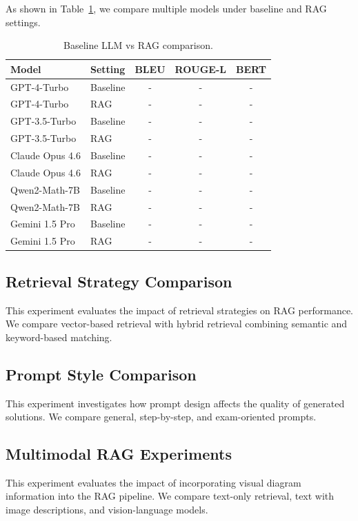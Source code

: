 \documentclass[11pt]{article}
\begin{document}
As shown in Table~\ref{tab:e1}, we compare multiple models under baseline and RAG settings.

\begin{table}[t]
\centering
\scriptsize
\begin{tabular}{llccc}
\toprule
Model & Setting & BLEU & ROUGE-L & BERT \\
\midrule
GPT-4-Turbo & Baseline & - & - & - \\
GPT-4-Turbo & RAG & - & - & - \\
GPT-3.5-Turbo & Baseline & - & - & - \\
GPT-3.5-Turbo & RAG & - & - & - \\
Claude Opus 4.6 & Baseline & - & - & - \\
Claude Opus 4.6 & RAG & - & - & - \\
Qwen2-Math-7B & Baseline & - & - & - \\
Qwen2-Math-7B & RAG & - & - & - \\
Gemini 1.5 Pro & Baseline & - & - & - \\
Gemini 1.5 Pro & RAG & - & - & - \\
\bottomrule
\end{tabular}
\caption{Baseline LLM vs RAG comparison.}
\label{tab:e1}
\end{table}

\subsection{Retrieval Strategy Comparison}

This experiment evaluates the impact of retrieval strategies on RAG performance. We compare vector-based retrieval with hybrid retrieval combining semantic and keyword-based matching.

\subsection{Prompt Style Comparison}

This experiment investigates how prompt design affects the quality of generated solutions. We compare general, step-by-step, and exam-oriented prompts.

\subsection{Multimodal RAG Experiments}

This experiment evaluates the impact of incorporating visual diagram information into the RAG pipeline. We compare text-only retrieval, text with image descriptions, and vision-language models.
\end{document}
